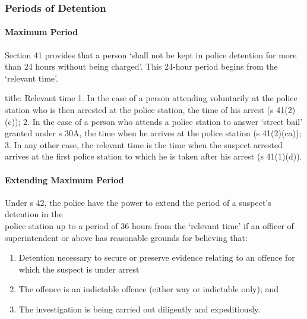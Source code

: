 \documentclass[
]{article}
\newenvironment{Shaded}{}{}
\newcommand{\NormalTok}[1]{#1}
\providecommand{\tightlist}{%
  \setlength{\itemsep}{0pt}\setlength{\parskip}{0pt}}
\begin{document}
\hypertarget{periods-of-detention}{%
\subsubsection{Periods of Detention}\label{periods-of-detention}}

\hypertarget{maximum-period}{%
\paragraph{Maximum Period}\label{maximum-period}}

Section 41 provides that a person `shall not be kept in police detention
for more than 24 hours without being charged'. This 24-hour period
begins from the `relevant time'.

\begin{Shaded}
\begin{Highlighting}[]
\NormalTok{title: Relevant time}
\NormalTok{1. In the case of a person attending voluntarily at the police station who is then arrested at the police station, the time of his arrest (s 41(2)(c));}
\NormalTok{2. In the case of a person who attends a police station to answer ‘street bail’ granted under s 30A, the time when he arrives at the police station (s 41(2)(ca));}
\NormalTok{3. In any other case, the relevant time is the time when the suspect arrested arrives at the first police station to which he is taken after his arrest (s 41(1)(d)).}
\end{Highlighting}
\end{Shaded}

\hypertarget{extending-maximum-period}{%
\paragraph{Extending Maximum Period}\label{extending-maximum-period}}

Under s 42, the police have the power to extend the period of a
suspect's detention in the\\
police station up to a period of 36 hours from the `relevant time' if an
officer of superintendent or above has reasonable grounds for believing
that:

\begin{enumerate}
\def\labelenumi{\arabic{enumi}.}
\tightlist
\item
  Detention necessary to secure or preserve evidence relating to an
  offence for which the suspect is under arrest
\item
  The offence is an indictable offence (either way or indictable only);
  and
\item
  The investigation is being carried out diligently and expeditiously.
\end{enumerate}
\end{document}
